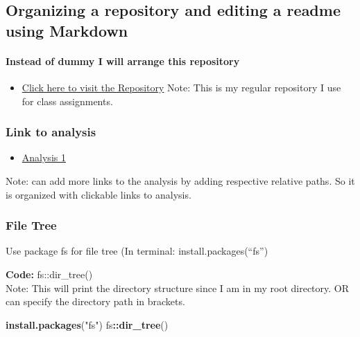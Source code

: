 \documentclass[
]{article}
\newenvironment{Shaded}{\begin{snugshade}}{\end{snugshade}}
\newcommand{\FunctionTok}[1]{\textcolor[rgb]{0.13,0.29,0.53}{\textbf{#1}}}
\newcommand{\NormalTok}[1]{#1}
\newcommand{\SpecialCharTok}[1]{\textcolor[rgb]{0.81,0.36,0.00}{\textbf{#1}}}
\newcommand{\StringTok}[1]{\textcolor[rgb]{0.31,0.60,0.02}{#1}}
\providecommand{\tightlist}{%
  \setlength{\itemsep}{0pt}\setlength{\parskip}{0pt}}
\begin{document}
\subsection{\texorpdfstring{\textbf{Organizing a repository and editing
a readme using
Markdown}}{Organizing a repository and editing a readme using Markdown}}\label{organizing-a-repository-and-editing-a-readme-using-markdown-1}

\paragraph{Instead of dummy I will arrange this
repository}\label{instead-of-dummy-i-will-arrange-this-repository}

\begin{itemize}
\tightlist
\item
  \href{https://github.com/ppg0001/PLPA_Assignment}{Click here to visit
  the Repository} Note: This is my regular repository I use for class
  assignments.
\end{itemize}

\subsubsection{\texorpdfstring{\textbf{Link to
analysis}}{Link to analysis}}\label{link-to-analysis}

\begin{itemize}
\tightlist
\item
  \href{Coding_practice_Rmarkdown.md}{Analysis 1}
\end{itemize}

Note: can add more links to the analysis by adding respective relative
paths. So it is organized with clickable links to analysis.

\subsubsection{\texorpdfstring{\textbf{File
Tree}}{File Tree}}\label{file-tree}

Use package fs for file tree (In terminal: install.packages(``fs'')

\textbf{Code:} fs::dir\_tree()\\
Note: This will print the directory structure since I am in my root
directory. OR can specify the directory path in brackets.

\begin{Shaded}
\begin{Highlighting}[]
\FunctionTok{install.packages}\NormalTok{(}\StringTok{"fs"}\NormalTok{)}
\NormalTok{fs}\SpecialCharTok{::}\FunctionTok{dir\_tree}\NormalTok{()}
\end{Highlighting}
\end{Shaded}
\end{document}
